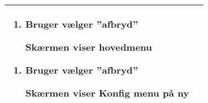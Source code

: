 \begin{center}
\begin{longtable}{|p{5cm}|p{9cm}|}
\begin{enumerate}[label=\ref{uc2afbryd}.a]
				\item Bruger vælger ''afbryd''
				
					\subitem Skærmen viser hovedmenu
			\end{enumerate}
			
			\begin{enumerate}[label=\ref{uc2afbryd2}.a]
				
				\item Bruger vælger ''afbryd''
				
				\subitem Skærmen viser Konfig menu på ny

			\end{enumerate}														\\\hline
	\end{longtable}
\end{center}

